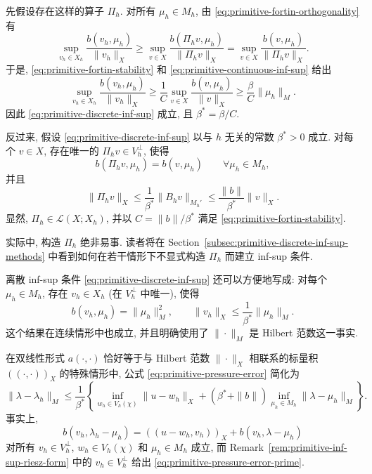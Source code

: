 \begin{Proof}
先假设存在这样的算子 $\Pi_h$. 对所有 $\mu_h\in M_h$, 由
\eqref{eq:primitive-fortin-orthogonality} 有
\[
\sup_{v_h\in X_h}\frac{b(v_h,\mu_h)}{\|v_h\|_X}
\geq\sup_{v\in X}\frac{b(\Pi_hv,\mu_h)}{\|\Pi_hv\|_X}
=\sup_{v\in X}\frac{b(v,\mu_h)}{\|\Pi_hv\|_X}.
\]
于是, \eqref{eq:primitive-fortin-stability} 和
\eqref{eq:primitive-continuous-inf-sup} 给出
\[
\sup_{v_h\in X_h}\frac{b(v_h,\mu_h)}{\|v_h\|_X}
\geq\frac{1}{C}\sup_{v\in X}\frac{b(v,\mu_h)}{\|v\|_X}
\geq\frac{\beta}{C}\|\mu_h\|_M.
\]
因此 \eqref{eq:primitive-discrete-inf-sup} 成立, 且 $\beta^*=\beta/C$.

反过来, 假设 \eqref{eq:primitive-discrete-inf-sup} 以与 $h$ 无关的常数
$\beta^*>0$ 成立. 对每个 $v\in X$, 存在唯一的
$\Pi_hv\in V_h^\perp$, 使得
\[
b(\Pi_hv,\mu_h)=b(v,\mu_h)
\qquad\forall\mu_h\in M_h,
\]
并且
\[
\|\Pi_hv\|_X
\leq\frac{1}{\beta^*}\|B_hv\|_{M_h'}
\leq\frac{\|b\|}{\beta^*}\|v\|_X.
\]
显然, $\Pi_h\in\mathcal L(X;X_h)$, 并以
$C=\|b\|/\beta^*$ 满足 \eqref{eq:primitive-fortin-stability}.
\end{Proof}

实际中, 构造 $\Pi_h$ 绝非易事. 读者将在 Section~\ref{subsec:primitive-discrete-inf-sup-methods}
中看到如何在若干情形下不显式构造 $\Pi_h$ 而建立 inf-sup 条件.

\setcounter{statement}{3}
\begin{Remark}\label{rem:primitive-inf-sup-riesz-form}
离散 inf-sup 条件 \eqref{eq:primitive-discrete-inf-sup} 还可以方便地写成:
对每个 $\mu_h\in M_h$, 存在 $v_h\in X_h$ (在 $V_h^\perp$ 中唯一), 使得
\[
b(v_h,\mu_h)=\|\mu_h\|_M^2,
\qquad
\|v_h\|_X\leq\frac{1}{\beta^*}\|\mu_h\|_M.
\]
这个结果在连续情形中也成立, 并且明确使用了 $\|\cdot\|_M$ 是 Hilbert 范数这一事实.
\end{Remark}

\setcounter{statement}{4}
\begin{Remark}\label{rem:primitive-pressure-error-inner-product}
在双线性形式 $a(\cdot,\cdot)$ 恰好等于与 Hilbert 范数
$\|\cdot\|_X$ 相联系的标量积 $((\cdot,\cdot))_X$ 的特殊情形中,
公式 \eqref{eq:primitive-pressure-error} 简化为
\begin{equation}\label{eq:primitive-pressure-error-prime}
\|\lambda-\lambda_h\|_M
\leq\frac{1}{\beta^*}\left\{
\inf_{w_h\in V_h(\chi)}\|u-w_h\|_X
+(\beta^*+\|b\|)\inf_{\mu_h\in M_h}\|\lambda-\mu_h\|_M
\right\}.
\tag{1.17$'$}
\end{equation}
事实上,
\[
b(v_h,\lambda_h-\mu_h)
=((u-w_h,v_h))_X+b(v_h,\lambda-\mu_h)
\]
对所有 $v_h\in V_h^\perp$, $w_h\in V_h(\chi)$ 和 $\mu_h\in M_h$ 成立,
而 Remark~\ref{rem:primitive-inf-sup-riesz-form} 中的 $v_h\in V_h^\perp$
给出 \eqref{eq:primitive-pressure-error-prime}.
\end{Remark}

